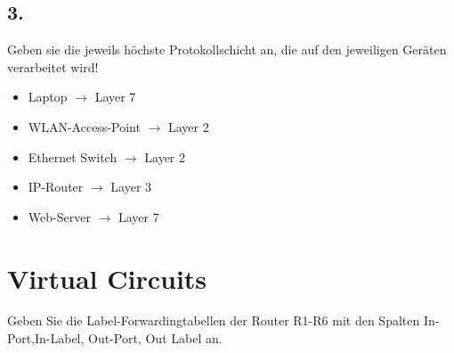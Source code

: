 \documentclass[paper=a4, fontsize=11pt]{scrartcl}
\numberwithin{equation}{section}
\numberwithin{figure}{section}
\numberwithin{table}{section}
\begin{document}
\subsection{3.}
Geben sie die jeweils höchste Protokollschicht an, die auf den jeweiligen Geräten verarbeitet wird! \\

\begin{itemize}
\item Laptop $\rightarrow$ Layer 7
\item WLAN-Access-Point $\rightarrow$ Layer 2
\item Ethernet Switch $\rightarrow$ Layer 2
\item IP-Router $\rightarrow$ Layer 3
\item Web-Server $\rightarrow$ Layer 7
\end{itemize}


\section{Virtual Circuits}
Geben Sie die Label-Forwardingtabellen der Router R1-R6 mit den Spalten In-Port,In-Label, Out-Port, Out Label an. \\
\end{document}
